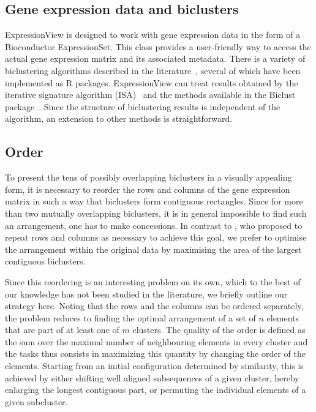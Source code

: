 \documentclass[round]{bioinfo}
\begin{document}
\subsection{Gene expression data and biclusters}
ExpressionView is designed to work with gene expression data in the form of a Bioconductor ExpressionSet. This class provides a user-friendly way to access the actual gene expression matrix and its associated metadata. There is a variety of biclustering algorithms described in the literature~\citep{madeira04,prelic06}, several of which have been implemented as R packages. ExpressionView can treat results obtained by the iterative signature algorithm (ISA)~\citep{bergmann03} %
and the methods available in the Biclust package~\citep{kaiser08}. Since the structure of biclustering results is independent of the algorithm, an extension to other methods is straightforward.

\subsection{Order}
To present the tens of possibly overlapping biclusters in a visually appealing form, it is necessary to reorder the rows and columns of the gene expression matrix in such a way that biclusters form contiguous rectangles. Since for more than two mutually overlapping biclusters, it is in general impossible to find such an arrangement, one has to make concessions. In contrast to \cite{grothaus06}, who proposed to repeat rows and columns as necessary to achieve this goal, we prefer to optimise the arrangement within the original data by maximising the area of the largest contiguous biclusters. 

Since this reordering is an interesting problem on its own, which to the best of our knowledge has not been studied in the literature, we briefly outline our strategy here. Noting that the rows and the columns can be ordered separately, the problem reduces to finding the optimal arrangement of a set of $n$ elements that are part of at least one of $m$ clusters. The quality of the order is defined as the sum over the maximal number of neighbouring elements in every cluster and the tasks thus consists in maximizing this quantity by changing the order of the elements. Starting from an initial configuration determined by similarity, this is achieved by either shifting well aligned subsequences of a given cluster, hereby enlarging the longest contiguous part, or permuting the individual elements of a given subcluster. 
\end{document}
